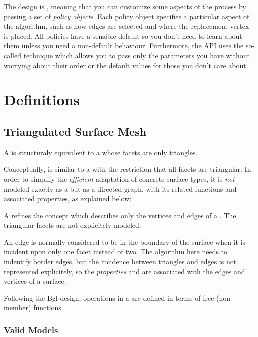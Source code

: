 The design is ,
meaning that you can customize some aspects of the process by passing a set of {\em policy objects}. Each policy object specifies a particular aspect of the algorithm, such as how edges are selected and where the replacement vertex is placed. All policies have a sensible default so you don't need to learn about them unless you need a non-default behaviour. Furthermore, the API uses the so-called  technique which allows you to pass only the parameters you have without worrying about their order or the default values for those you don't care about.

\section{Definitions\label{SurfaceMeshSimplification:SecDefinitions}}

\subsection{Triangulated Surface Mesh}

A  is structuraly equivalent to a  whose facets are only triangles.

Conceptually, is similar to a  with the restriction that all facets are triangular. In order to simplify the {\em efficient} adaptation of concrete surface types, it is {\em not} modeled exactly as a  but as a directed graph, with its related functions and associated properties, as explained below:

A  refines the  concept which describes only the vertices and edges of a . The triangular facets are not explicitely modeled. 

An edge is normally considered to be in the boundary of the surface when it is incident upon only one facet instead of two. The algorithm here needs to indentify border edges, but the incidence between triangles and edges is not represented explicitely, so the {\em properties}  and  are associated with the edges and vertices of a surface.

Following the {\sc Bgl} design, operations in a  are defined in terms of free (non-member) functions.

\subsubsection{Valid Models}

